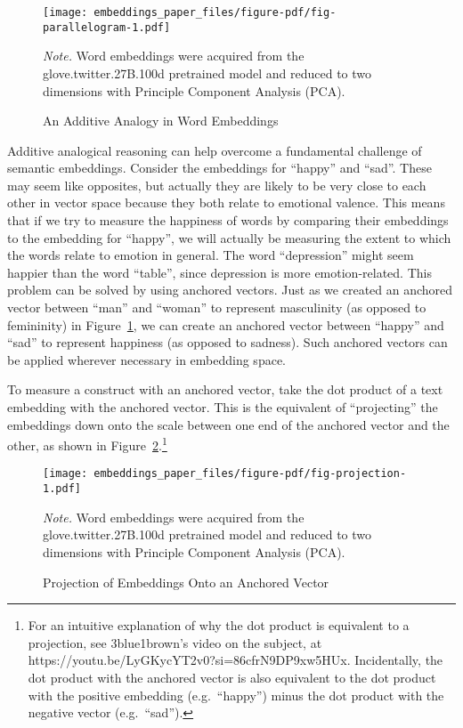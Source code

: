 \documentclass[
  man,
  floatsintext,
  longtable,
  nolmodern,
  notxfonts,
  notimes,
  colorlinks=true,linkcolor=blue,citecolor=blue,urlcolor=blue]{apa7}
\begin{document}
\begin{figure}[!htbp]

{\caption{{An Additive Analogy in Word
Embeddings}{\label{fig-parallelogram}}}}

\texttt{[image: embeddings\_paper\_files/figure-pdf/fig-parallelogram-1.pdf]}

{\noindent \emph{Note.} Word embeddings were acquired from the
glove.twitter.27B.100d pretrained model and reduced to two dimensions
with Principle Component Analysis (PCA).}

\end{figure}

Additive analogical reasoning can help overcome a fundamental challenge
of semantic embeddings. Consider the embeddings for ``happy'' and
``sad''. These may seem like opposites, but actually they are likely to
be very close to each other in vector space because they both relate to
emotional valence. This means that if we try to measure the happiness of
words by comparing their embeddings to the embedding for ``happy'', we
will actually be measuring the extent to which the words relate to
emotion in general. The word ``depression'' might seem happier than the
word ``table'', since depression is more emotion-related. This problem
can be solved by using anchored vectors. Just as we created an anchored
vector between ``man'' and ``woman'' to represent masculinity (as
opposed to femininity) in Figure~\ref{fig-parallelogram}, we can create
an anchored vector between ``happy'' and ``sad'' to represent happiness
(as opposed to sadness). Such anchored vectors can be applied wherever
necessary in embedding space.

To measure a construct with an anchored vector, take the dot product of
a text embedding with the anchored vector. This is the equivalent of
``projecting'' the embeddings down onto the scale between one end of the
anchored vector and the other, as shown in
Figure~\ref{fig-projection}.\footnote{For an intuitive explanation of
  why the dot product is equivalent to a projection, see 3blue1brown's
  video on the subject, at
  https://youtu.be/LyGKycYT2v0?si=86cfrN9DP9xw5HUx. Incidentally, the
  dot product with the anchored vector is also equivalent to the dot
  product with the positive embedding (e.g.~``happy'') minus the dot
  product with the negative vector (e.g.~``sad'').}

\begin{figure}[!htbp]

{\caption{{Projection of Embeddings Onto an Anchored
Vector}{\label{fig-projection}}}}

\texttt{[image: embeddings\_paper\_files/figure-pdf/fig-projection-1.pdf]}

{\noindent \emph{Note.} Word embeddings were acquired from the
glove.twitter.27B.100d pretrained model and reduced to two dimensions
with Principle Component Analysis (PCA).}

\end{figure}
\end{document}
